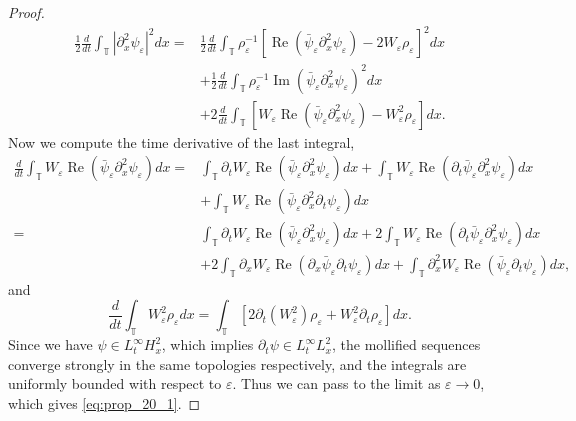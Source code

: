 \documentclass[leqno]{amsart}
\theoremstyle{plain}
\theoremstyle{definition}
\theoremstyle{remark}
\theoremstyle{plain}
\theoremstyle{plain}
\def\T{{\mathbb T}}%
\def\d{{\partial}}
\def\eps{\varepsilon}
\DeclareMathOperator{\RE}{Re}
\DeclareMathOperator{\IM}{Im}
\numberwithin{equation}{section}
\begin{document}
\begin{proof}
\begin{align*}
\frac12\frac{d}{dt}\int_\T|\d_x^2\psi_\eps|^2dx=&\frac12\frac{d}{dt}\int_\T \rho_\eps^{-1}[\RE(\bar\psi_\eps\d_x^2\psi_\eps)-2W_\eps\rho_\eps]^2dx\\
&+\frac12\frac{d}{dt}\int_\T \rho_\eps^{-1}\IM(\bar\psi_\eps\d_x^2\psi_\eps)^2dx\\
&+2\frac{d}{dt}\int_\T [W_\eps\RE(\bar\psi_\eps\d_x^2\psi_\eps)-W_\eps^2\rho_\eps]dx.
\end{align*}
Now we compute the time derivative of the last integral,
\begin{align*}
\frac{d}{dt}\int_\T W_\eps\RE(\bar\psi_\eps\d_x^2\psi_\eps)dx=&\int_\T \d_tW_\eps\RE(\bar\psi_\eps\d_x^2\psi_\eps)dx+\int_\T W_\eps\RE(\d_t\bar\psi_\eps\d_x^2\psi_\eps)dx\\
&+\int_\T W_\eps\RE(\bar\psi_\eps\d_x^2\d_t\psi_\eps)dx\\
=&\int_\T \d_tW_\eps\RE(\bar\psi_\eps\d_x^2\psi_\eps)dx+2\int_\T W_\eps\RE(\d_t\bar\psi_\eps\d_x^2\psi_\eps)dx\\
&+2\int_\T \d_xW_\eps\RE(\d_x\bar\psi_\eps\d_t\psi_\eps)dx+\int_\T \d_x^2W_\eps\RE(\bar\psi_\eps\d_t\psi_\eps)dx,
\end{align*}
and
\[
\frac{d}{dt}\int_\T W_\eps^ 2\rho_\eps dx=\int_\T [2\d_t (W_\eps^2)\rho_\eps+W_\eps^2\d_t \rho_\eps] dx.
\]
Since we have $\psi\in L^\infty_tH^2_x$, which implies $\d_t\psi\in L^\infty_tL^2_x$,  the mollified sequences converge strongly in the same topologies respectively, and the integrals are uniformly bounded with respect to $\eps$. Thus we can pass to the limit as $\eps\to 0$, which gives \eqref{eq:prop_20_1}.


\end{proof}
\end{document}
